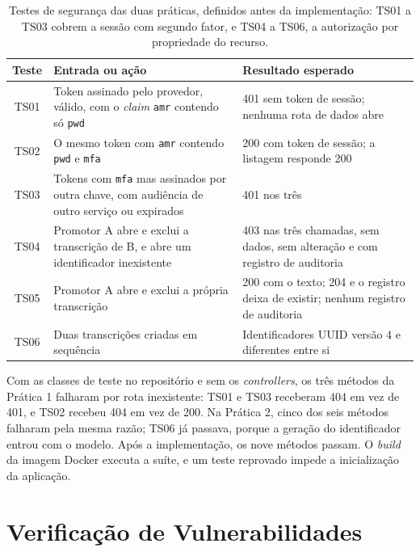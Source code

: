 \documentclass[12pt]{article}
\begin{document}
    \begin{table}[htbp]
        \centering
        \caption{Testes de segurança das duas práticas, definidos antes da implementação: TS01 a TS03 cobrem a sessão com segundo fator, e TS04 a TS06, a autorização por propriedade do recurso.}
        \label{tab:testes}
        \footnotesize
        \begin{tabular}{|c|p{6cm}|p{5.4cm}|}
            \hline
            \textbf{Teste} & \textbf{Entrada ou ação} & \textbf{Resultado esperado} \\
            \hline
            TS01 & Token assinado pelo provedor, válido, com o \textit{claim} \texttt{amr} contendo só \texttt{pwd} & 401 sem token de sessão; nenhuma rota de dados abre \\
            \hline
            TS02 & O mesmo token com \texttt{amr} contendo \texttt{pwd} e \texttt{mfa} & 200 com token de sessão; a listagem responde 200 \\
            \hline
            TS03 & Tokens com \texttt{mfa} mas assinados por outra chave, com audiência de outro serviço ou expirados & 401 nos três \\
            \hline
            TS04 & Promotor A abre e exclui a transcrição de B, e abre um identificador inexistente & 403 nas três chamadas, sem dados, sem alteração e com registro de auditoria \\
            \hline
            TS05 & Promotor A abre e exclui a própria transcrição & 200 com o texto; 204 e o registro deixa de existir; nenhum registro de auditoria \\
            \hline
            TS06 & Duas transcrições criadas em sequência & Identificadores UUID versão 4 e diferentes entre si \\
            \hline
        \end{tabular}
    \end{table}

    Com as classes de teste no repositório e sem os \textit{controllers}, os três métodos da Prática 1 falharam por rota inexistente: TS01 e TS03 receberam 404 em vez de 401, e TS02 recebeu 404 em vez de 200.
    Na Prática 2, cinco dos seis métodos falharam pela mesma razão; TS06 já passava, porque a geração do identificador entrou com o modelo.
    Após a implementação, os nove métodos passam.
    O \textit{build} da imagem Docker executa a suíte, e um teste reprovado impede a inicialização da aplicação.

    \section{Verificação de Vulnerabilidades}
    \label{sec:verificacao}
\end{document}
